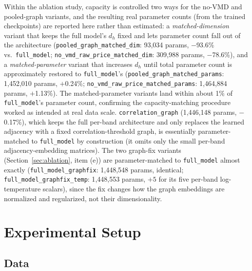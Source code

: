 \documentclass[journal]{IEEEtran}
\begin{document}
Within the ablation study, capacity is controlled two ways for the no-VMD and pooled-graph variants, and the resulting real parameter counts (from the trained checkpoints) are reported here rather than estimated: a \emph{matched-dimension} variant that keeps the full model's $d_h$ fixed and lets parameter count fall out of the architecture (\texttt{pooled\_graph\_matched\_dim}: 93{,}034 params, $-$93.6\% vs.\ \texttt{full\_model}; \texttt{no\_vmd\_raw\_price\_matched\_dim}: 309{,}988 params, $-$78.6\%), and a \emph{matched-parameter} variant that increases $d_h$ until total parameter count is approximately restored to \texttt{full\_model}'s (\texttt{pooled\_graph\_matched\_params}: 1{,}452{,}010 params, $+$0.24\%; \texttt{no\_vmd\_raw\_price\_matched\_params}: 1{,}464{,}884 params, $+$1.13\%). The matched-parameter variants land within about 1\% of \texttt{full\_model}'s parameter count, confirming the capacity-matching procedure worked as intended at real data scale. \texttt{correlation\_graph} (1{,}446{,}148 params, $-$0.17\%), which keeps the full per-band architecture and only replaces the learned adjacency with a fixed correlation-threshold graph, is essentially parameter-matched to \texttt{full\_model} by construction (it omits only the small per-band adjacency-embedding matrices). The two graph-fix variants (Section~\ref{sec:ablation}, item (e)) are parameter-matched to \texttt{full\_model} almost exactly (\texttt{full\_model\_graphfix}: 1{,}448{,}548 params, identical; \texttt{full\_model\_graphfix\_temp}: 1{,}448{,}553 params, $+5$ for its five per-band log-temperature scalars), since the fix changes how the graph embeddings are normalized and regularized, not their dimensionality.

\FloatBarrier

\section{Experimental Setup}
\label{sec:experiments}

\subsection{Data}
\label{sec:data}
\end{document}
